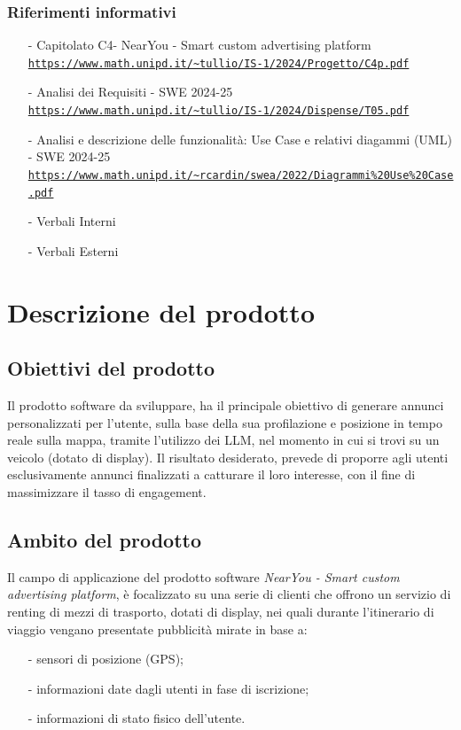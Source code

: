 \documentclass[11pt]{article}
\begin{document}
\begin{justify}
\begin{itemize}
\end{itemize}
\subsubsection{Riferimenti informativi}
\begin{itemize}
    \item[-] Capitolato C4- NearYou - 
Smart custom advertising platform\\
    \textcolor{blue}{\texttt{\url{https://www.math.unipd.it/~tullio/IS-1/2024/Progetto/C4p.pdf}}}
    \item[-] Analisi dei Requisiti - SWE 2024-25\\
    \textcolor{blue}{\texttt{\url{https://www.math.unipd.it/~tullio/IS-1/2024/Dispense/T05.pdf}}}
    \item[-] Analisi e descrizione delle funzionalità: Use Case e relativi diagammi (UML) - SWE 2024-25\\    
    \textcolor{blue}{\texttt{\url{https://www.math.unipd.it/~rcardin/swea/2022/Diagrammi\%20Use\%20Case.pdf}}}
    \item[-] Verbali Interni
    \item[-] Verbali Esterni
    
\end{itemize}

\newpage
\section{Descrizione del prodotto}
\label{sec:descrizione}
\subsection{Obiettivi del prodotto}

Il prodotto software da sviluppare, ha il principale obiettivo di generare annunci personalizzati per l'utente, 
sulla base della sua profilazione e posizione in tempo reale sulla mappa, tramite l'utilizzo dei LLM, nel momento 
in cui si trovi su un veicolo (dotato di display). Il risultato desiderato, prevede di proporre agli utenti 
esclusivamente annunci finalizzati a catturare il loro interesse, con il fine di massimizzare il tasso di engagement.
\subsection{Ambito del prodotto}
Il campo di applicazione del prodotto software \textit{NearYou - 
Smart custom advertising platform}, è focalizzato su una serie di clienti che offrono un servizio di renting di 
mezzi di trasporto, dotati di display, nei quali durante l'itinerario di viaggio vengano presentate pubblicità 
mirate in base a:
\begin{itemize}
    \item [-] sensori di posizione (GPS);
    \item [-] informazioni date dagli utenti in fase di iscrizione;
    \item [-] informazioni di stato fisico dell’utente.
\end{itemize}


\end{justify}
\end{document}

